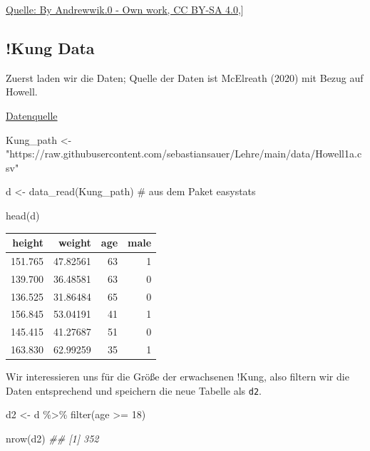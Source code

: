 \documentclass[
  a4paper,
  DIV=11]{scrreprt}
\newenvironment{Shaded}{\begin{snugshade}}{\end{snugshade}}
\newcommand{\CommentTok}[1]{\textcolor[rgb]{0.37,0.37,0.37}{#1}}
\newcommand{\DecValTok}[1]{\textcolor[rgb]{0.68,0.00,0.00}{#1}}
\newcommand{\DocumentationTok}[1]{\textcolor[rgb]{0.37,0.37,0.37}{\textit{#1}}}
\newcommand{\FunctionTok}[1]{\textcolor[rgb]{0.28,0.35,0.67}{#1}}
\newcommand{\NormalTok}[1]{\textcolor[rgb]{0.00,0.23,0.31}{#1}}
\newcommand{\OtherTok}[1]{\textcolor[rgb]{0.00,0.23,0.31}{#1}}
\newcommand{\SpecialCharTok}[1]{\textcolor[rgb]{0.37,0.37,0.37}{#1}}
\newcommand{\StringTok}[1]{\textcolor[rgb]{0.13,0.47,0.30}{#1}}
\theoremstyle{definition}
\theoremstyle{remark}
\begin{document}
\href{https://commons.wikimedia.org/w/index.php?curid=79801340}{Quelle:
By Andrewwik.0 - Own work, CC BY-SA 4.0,}{]}

\hypertarget{kung-data}{%
\subsection{!Kung Data}\label{kung-data}}

Zuerst laden wir die Daten; Quelle der Daten ist McElreath (2020) mit
Bezug auf Howell.

\href{https://raw.githubusercontent.com/sebastiansauer/2021-wise/main/Data/Howell1a.csv}{Datenquelle}

\begin{Shaded}
\begin{Highlighting}[]
\NormalTok{Kung\_path }\OtherTok{\textless{}{-}}  
  \StringTok{"https://raw.githubusercontent.com/sebastiansauer/Lehre/main/data/Howell1a.csv"}  

\NormalTok{d }\OtherTok{\textless{}{-}} \FunctionTok{data\_read}\NormalTok{(Kung\_path)  }\CommentTok{\# aus dem Paket \textasciigrave{}easystats\textasciigrave{}}

\FunctionTok{head}\NormalTok{(d)}
\end{Highlighting}
\end{Shaded}

\begin{longtable}[]{@{}rrrr@{}}
\toprule()
height & weight & age & male \\
\midrule()
\endhead
151.765 & 47.82561 & 63 & 1 \\
139.700 & 36.48581 & 63 & 0 \\
136.525 & 31.86484 & 65 & 0 \\
156.845 & 53.04191 & 41 & 1 \\
145.415 & 41.27687 & 51 & 0 \\
163.830 & 62.99259 & 35 & 1 \\
\bottomrule()
\end{longtable}

Wir interessieren uns für die Größe der erwachsenen !Kung, also filtern
wir die Daten entsprechend und speichern die neue Tabelle als
\texttt{d2}.

\begin{Shaded}
\begin{Highlighting}[]
\NormalTok{d2 }\OtherTok{\textless{}{-}}\NormalTok{ d }\SpecialCharTok{\%\textgreater{}\%} 
  \FunctionTok{filter}\NormalTok{(age }\SpecialCharTok{\textgreater{}=} \DecValTok{18}\NormalTok{)}

\FunctionTok{nrow}\NormalTok{(d2)}
\DocumentationTok{\#\# [1] 352}
\end{Highlighting}
\end{Shaded}
\end{document}
